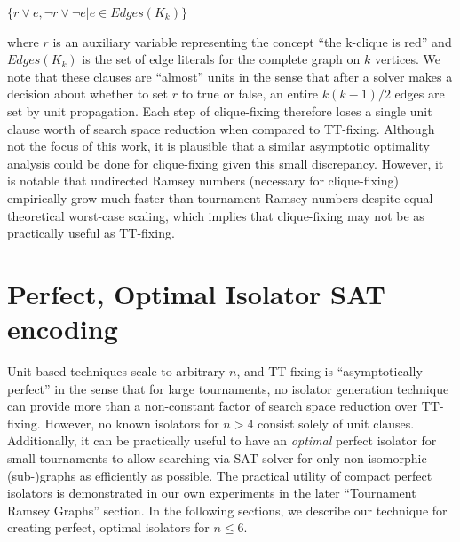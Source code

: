 \documentclass[conference]{IEEEtran}
\begin{document}
$\{r \lor e, \lnot r \lor \lnot e | e \in \mathit{Edges}(K_k)\}$


where $r$ is an auxiliary variable representing the concept ``the k-clique is red'' and $\mathit{Edges}(K_k)$ is the set of edge literals for the complete graph on $k$ vertices. We note that these clauses are ``almost'' units in the sense that after a solver makes a decision about whether to set $r$ to true or false, an entire $k(k-1)/2$ edges are set by unit propagation. Each step of clique-fixing therefore loses a single unit clause worth of search space reduction when compared to TT-fixing. Although not the focus of this work, it is plausible that a similar asymptotic optimality analysis could be done for clique-fixing given this small discrepancy. However, it is notable that undirected Ramsey numbers (necessary for clique-fixing) empirically grow much faster than tournament Ramsey numbers despite equal theoretical worst-case scaling, which implies that clique-fixing may not be as practically useful as TT-fixing.










\section{Perfect, Optimal Isolator SAT encoding}

Unit-based techniques scale to arbitrary $n$, and TT-fixing is ``asymptotically perfect'' in the sense that for large tournaments, no isolator generation technique can provide more than a non-constant factor of search space reduction over TT-fixing. However, no known isolators for $n>4$ consist solely of unit clauses. Additionally, it can be practically useful to have an \emph{optimal} perfect isolator for small tournaments to allow searching via SAT solver for only non-isomorphic (sub-)graphs as efficiently as possible. The practical utility of compact perfect isolators is demonstrated in our own experiments in the later ``Tournament Ramsey Graphs'' section. In the following sections, we describe our technique for creating perfect, optimal isolators for $n \le 6$.
\end{document}
